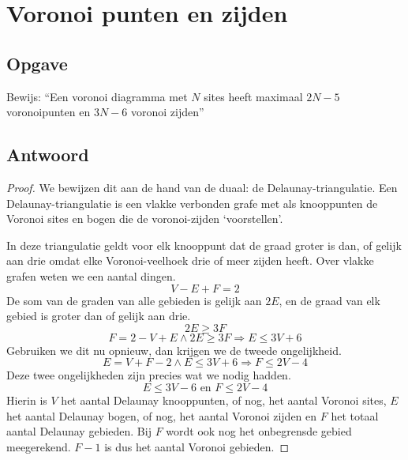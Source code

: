 \documentclass[examenvragen.tex]{subfiles}
\begin{document}
\section{Voronoi punten en zijden}
\subsection{Opgave}
Bewijs: ``Een voronoi diagramma met $N$ sites heeft maximaal $2N - 5$ voronoipunten en $3N - 6$ voronoi zijden''

\subsection{Antwoord}
\begin{proof}
We bewijzen dit aan de hand van de duaal: de Delaunay-triangulatie.
Een Delaunay-triangulatie is een vlakke verbonden grafe met als knooppunten de Voronoi sites en bogen die de voronoi-zijden `voorstellen'.

In deze triangulatie geldt voor elk knooppunt dat de graad groter is dan, of gelijk aan drie omdat elke Voronoi-veelhoek drie of meer zijden heeft.
Over vlakke grafen weten we een aantal dingen.
\[
V-E+F=2
\]
De som van de graden van alle gebieden is gelijk aan $2E$, en de graad van elk gebied is groter dan of gelijk aan drie.
\[
2E \ge 3F
\]
\[
F = 2-V+E \wedge 2E \ge 3F \Rightarrow E \le 3V+6
\]
Gebruiken we dit nu opnieuw, dan krijgen we de tweede ongelijkheid.
\[
E =V+F-2 \wedge E \le 3V+6 \Rightarrow F\le 2V-4
\]
Deze twee ongelijkheden zijn precies wat we nodig hadden.
\[
E \le 3V-6 \text{ en } F \le 2V-4
\]
Hierin is $V$ het aantal Delaunay knooppunten, of nog, het aantal Voronoi sites, $E$ het aantal Delaunay bogen, of nog, het aantal Voronoi zijden en $F$ het totaal aantal Delaunay gebieden. Bij $F$ wordt ook nog het onbegrensde gebied meegerekend. $F-1$ is dus het aantal Voronoi gebieden. 
\end{proof}
\end{document}
